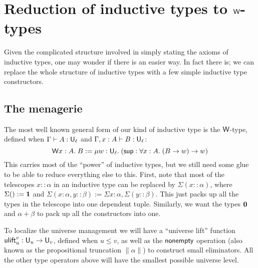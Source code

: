 \section{Reduction of inductive types to $\mathsf{W}$-types}\label{sec:wtype}

Given the complicated structure involved in simply stating the axioms of inductive types, one may wonder if there is an easier way. In fact there is; we can replace the whole structure of inductive types with a few simple inductive type constructors.

\subsection{The menagerie}
The most well known general form of our kind of inductive type is the $\mathsf{W}$-type, defined when $\Gamma\vdash A:\U_\ell$ and $\Gamma,x:A\vdash B:\U_\ell$:
$$\mathsf{W} x:A.\;B:=\mu w:\mathsf{U}_\ell.\;(\mathsf{sup}:\forall x:A.\;(B\to w)\to w)$$
This carries most of the ``power'' of inductive types, but we still need some glue to be able to reduce everything else to this. First, note that most of the telescopes $x::\alpha$ in an inductive type can be replaced by $\Sigma(x::\alpha)$, where $\Sigma ():=\bf 1$ and $\Sigma (x:\alpha,y::\beta):=\Sigma x:\alpha,\Sigma(y::\beta)$. This just packs up all the types in the telescope into one dependent tuple. Similarly, we want the types $\bf 0$ and $\alpha+\beta$ to pack up all the constructors into one.

To localize the universe management we will have a ``universe lift'' function $\mathsf{ulift}_u^v:\mathsf{U}_u\to\mathsf{U}_v$, defined when $u\le v$, as well as the $\mathsf{nonempty}$ operation (also known as the propositional truncation $\|\alpha\|$) to construct small eliminators. All the other type operators above will have the smallest possible universe level.

